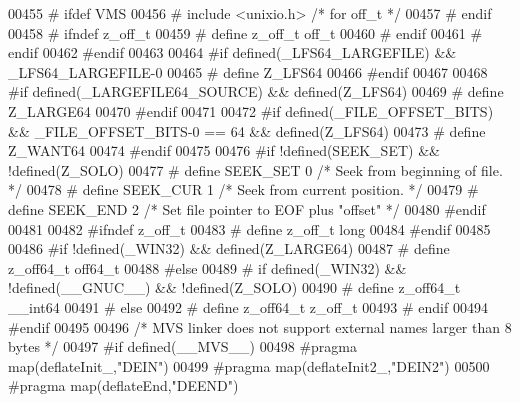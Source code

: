 \begin{DoxyCode}
00455 \textcolor{preprocessor}{#    ifdef VMS}
00456 \textcolor{preprocessor}{#      include <unixio.h>}       \textcolor{comment}{/* for off\_t */}
00457 \textcolor{preprocessor}{#    endif}
00458 \textcolor{preprocessor}{#    ifndef z\_off\_t}
00459 \textcolor{preprocessor}{#      define z\_off\_t off\_t}
00460 \textcolor{preprocessor}{#    endif}
00461 \textcolor{preprocessor}{#  endif}
00462 \textcolor{preprocessor}{#endif}
00463 
00464 \textcolor{preprocessor}{#if defined(\_LFS64\_LARGEFILE) && \_LFS64\_LARGEFILE-0}
00465 \textcolor{preprocessor}{#  define Z\_LFS64}
00466 \textcolor{preprocessor}{#endif}
00467 
00468 \textcolor{preprocessor}{#if defined(\_LARGEFILE64\_SOURCE) && defined(Z\_LFS64)}
00469 \textcolor{preprocessor}{#  define Z\_LARGE64}
00470 \textcolor{preprocessor}{#endif}
00471 
00472 \textcolor{preprocessor}{#if defined(\_FILE\_OFFSET\_BITS) && \_FILE\_OFFSET\_BITS-0 == 64 && defined(Z\_LFS64)}
00473 \textcolor{preprocessor}{#  define Z\_WANT64}
00474 \textcolor{preprocessor}{#endif}
00475 
00476 \textcolor{preprocessor}{#if !defined(SEEK\_SET) && !defined(Z\_SOLO)}
00477 \textcolor{preprocessor}{#  define SEEK\_SET        0       }\textcolor{comment}{/* Seek from beginning of file.  */}\textcolor{preprocessor}{}
00478 \textcolor{preprocessor}{#  define SEEK\_CUR        1       }\textcolor{comment}{/* Seek from current position.  */}\textcolor{preprocessor}{}
00479 \textcolor{preprocessor}{#  define SEEK\_END        2       }\textcolor{comment}{/* Set file pointer to EOF plus "offset" */}\textcolor{preprocessor}{}
00480 \textcolor{preprocessor}{#endif}
00481 
00482 \textcolor{preprocessor}{#ifndef z\_off\_t}
00483 \textcolor{preprocessor}{#  define z\_off\_t long}
00484 \textcolor{preprocessor}{#endif}
00485 
00486 \textcolor{preprocessor}{#if !defined(\_WIN32) && defined(Z\_LARGE64)}
00487 \textcolor{preprocessor}{#  define z\_off64\_t off64\_t}
00488 \textcolor{preprocessor}{#else}
00489 \textcolor{preprocessor}{#  if defined(\_WIN32) && !defined(\_\_GNUC\_\_) && !defined(Z\_SOLO)}
00490 \textcolor{preprocessor}{#    define z\_off64\_t \_\_int64}
00491 \textcolor{preprocessor}{#  else}
00492 \textcolor{preprocessor}{#    define z\_off64\_t z\_off\_t}
00493 \textcolor{preprocessor}{#  endif}
00494 \textcolor{preprocessor}{#endif}
00495 
00496 \textcolor{comment}{/* MVS linker does not support external names larger than 8 bytes */}
00497 \textcolor{preprocessor}{#if defined(\_\_MVS\_\_)}
00498 \textcolor{preprocessor}{  #pragma map(deflateInit\_,"DEIN")}
00499 \textcolor{preprocessor}{  #pragma map(deflateInit2\_,"DEIN2")}
00500 \textcolor{preprocessor}{  #pragma map(deflateEnd,"DEEND")}

\end{DoxyCode}
